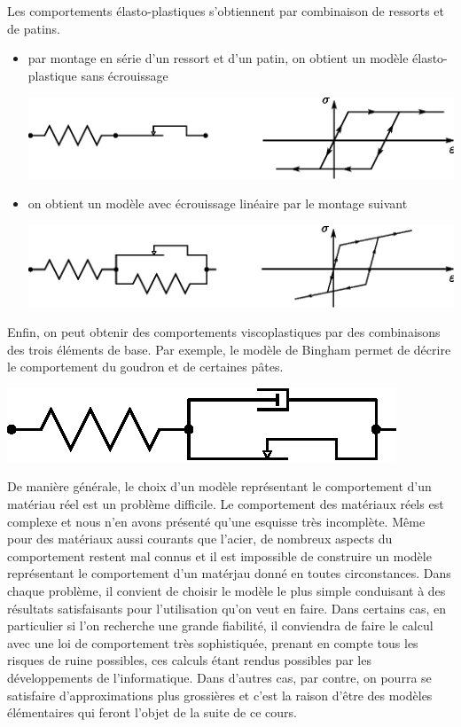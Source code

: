Les comportements élasto-plastiques s'obtiennent par combinaison de ressorts et de patins.
\begin{itemize}
    \item par montage en série d'un ressort et d'un patin, on obtient un modèle élasto-plastique sans écrouissage
        \begin{center}
            \includegraphics{../images/T1_Ch04-0028}
        \end{center}
    \item on obtient un modèle avec écrouissage linéaire par le montage suivant
        \begin{center}
            \includegraphics{../images/T1_Ch04-0029}
        \end{center}
\end{itemize}
Enfin, on peut obtenir des comportements viscoplastiques par des combinaisons des trois éléments de base.
Par exemple, le modèle de Bingham permet de décrire le comportement du goudron et de certaines pâtes.

    \begin{center}
        \includegraphics{../images/T1_Ch04-0030}
    \end{center}

De manière générale, le choix d'un modèle représentant le comportement d'un matériau réel est un problème difficile.
Le comportement des matériaux réels est complexe et nous n'en avons présenté qu'une esquisse très  incomplète.
Même pour des matériaux aussi courants que l'acier, de nombreux aspects du comportement restent mal connus et il est impossible de  construire un modèle représentant le comportement d'un matérjau donné en toutes circonstances.
Dans chaque problème, il convient de choisir le modèle le plus simple conduisant à des résultats satisfaisants pour l'utilisation qu'on veut en faire.
Dans certains cas, en particulier si l'on recherche une grande fiabilité, il conviendra de faire le calcul avec une loi de comportement très sophistiquée, prenant en compte tous les risques de ruine possibles, ces calculs étant rendus possibles par les développements de l'informatique.
Dans d'autres cas, par contre, on pourra se satisfaire d'approximations plus grossières et c'est la raison d'être des modèles élémentaires qui feront l'objet de la suite de ce cours.


